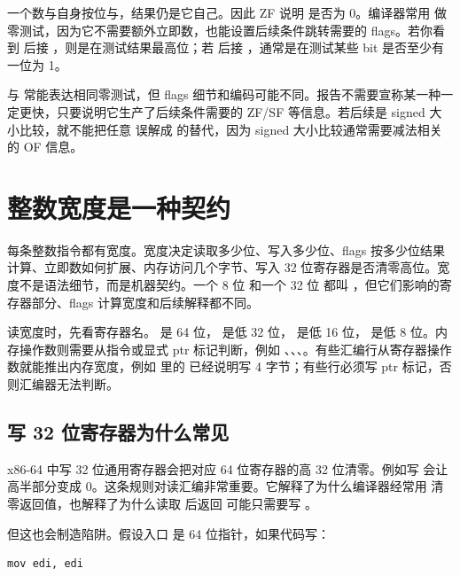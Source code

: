 一个数与自身按位与，结果仍是它自己。因此 ZF 说明  是否为 0。编译器常用  做零测试，因为它不需要额外立即数，也能设置后续条件跳转需要的 flags。若你看到  后接 ，则是在测试结果最高位；若  后接 ，通常是在测试某些 bit 是否至少有一位为 1。

 与  常能表达相同零测试，但 flags 细节和编码可能不同。报告不需要宣称某一种一定更快，只要说明它生产了后续条件需要的 ZF/SF 等信息。若后续是 signed 大小比较，就不能把任意  误解成  的替代，因为 signed 大小比较通常需要减法相关的 OF 信息。

\section{整数宽度是一种契约}

每条整数指令都有宽度。宽度决定读取多少位、写入多少位、flags 按多少位结果计算、立即数如何扩展、内存访问几个字节、写入 32 位寄存器是否清零高位。宽度不是语法细节，而是机器契约。一个 8 位  和一个 32 位  都叫 ，但它们影响的寄存器部分、flags 计算宽度和后续解释都不同。

读宽度时，先看寄存器名。  是 64 位， 是低 32 位， 是低 16 位， 是低 8 位。内存操作数则需要从指令或显式 ptr 标记判断，例如 、、、。有些汇编行从寄存器操作数就能推出内存宽度，例如  里的  已经说明写 4 字节；有些行必须写 ptr 标记，否则汇编器无法判断。

\subsection{写 32 位寄存器为什么常见}

x86-64 中写 32 位通用寄存器会把对应 64 位寄存器的高 32 位清零。例如写  会让  高半部分变成 0。这条规则对读汇编非常重要。它解释了为什么编译器经常用  清零返回值，也解释了为什么读取  后返回  可能只需要写 。

但这也会制造陷阱。假设入口  是 64 位指针，如果代码写：

\begin{lstlisting}
mov edi, edi
\end{lstlisting}

